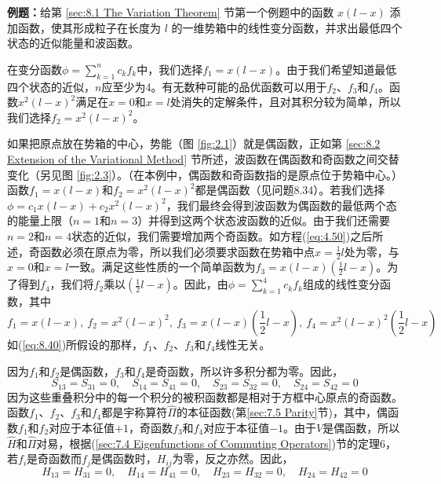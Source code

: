    \begin{examplebox}
        \textbf{例题：}给第 \ref{sec:8.1 The Variation Theorem} 节第一个例题中的函数 $x(l-x)$ 添加函数，使其形成粒子在长度为 $l$ 的一维势箱中的线性变分函数，并求出最低四个状态的近似能量和波函数。

        在变分函数$\phi = \sum_{k=1}^{n}c_kf_k$中，我们选择$f_1 = x(l-x)$。由于我们希望知道最低四个状态的近似，$n$应至少为4。有无数种可能的品优函数可以用于$f_2$、$f_3$和$f_4$。函数$x^2\left(l-x\right)^2$满足在$x=0$和$x=l$处消失的定解条件，且对其积分较为简单，所以我们选择$f_2 = x^2\left(l-x\right)^2$。

        如果把原点放在势箱的中心，势能（图 \ref{fig:2.1}）就是偶函数，正如第 \ref{sec:8.2 Extension of the Variational Method} 节所述，波函数在偶函数和奇函数之间交替变化（另见图 \ref{fig:2.3}）。（在本例中，偶函数和奇函数指的是原点位于势箱中心。）函数$f_1 = x\left(l-x\right)$和$f_2 = x^2\left(l-x\right)^2$都是偶函数（见问题8.34）。若我们选择$\phi = c_1x\left(l-x\right) + c_2x^2\left(l-x\right)^2$，我们最终会得到波函数为偶函数的最低两个态的能量上限（$n=1$和$n=3$）并得到这两个状态波函数的近似。由于我们还需要$n=2$和$n=4$状态的近似，我们需要增加两个奇函数。如方程(\ref{eq:4.50})之后所述，奇函数必须在原点为零，所以我们必须要求函数在势箱中点$x=\frac{1}{2}l$处为零，与$x=0$和$x=l$一致。满足这些性质的一个简单函数为$f_3 = x\left(l-x\right)\left(\frac{1}{2}l-x\right)$。为了得到$f_4$，我们将$f_2$乘以$\left(\frac{1}{2}l-x\right)$。因此，由$\phi = \sum_{k=1}^{4}c_kf_k$组成的线性变分函数，其中
        \begin{equation}
            f_1 = x\left(l-x\right), \: f_2 = x^2\left(l-x\right)^2, \: f_3 = x\left(l-x\right)\left(\frac{1}{2}l-x\right), \: f_4 = x^2\left(l-x\right)^2\left(\frac{1}{2}l-x\right)
            \label{eq:8.62}
        \end{equation}
        如(\ref{eq:8.40})所假设的那样，$f_1$、$f_2$、$f_3$和$f_4$线性无关。

        因为$f_1$和$f_2$是偶函数，$f_3$和$f_4$是奇函数，所以许多积分都为零。因此，
        \begin{equation}
            S_{13} = S_{31} = 0, \quad S_{14} = S_{41} = 0, \quad S_{23} = S_{32} = 0, \quad S_{24} = S_{42} = 0
            \label{eq:8.63}
        \end{equation}
        因为这些重叠积分中的每一个积分的被积函数都是相对于方框中心原点的奇函数。函数$f_1$、$f_2$、$f_3$和$f_4$都是宇称算符$\hat{\Pi}$的本征函数(第\ref{sec:7.5 Parity}节)，其中，偶函数$f_1$和$f_2$对应于本征值$+1$，奇函数$f_3$和$f_4$对应于本征值$-1$。由于$V$是偶函数，所以$\hat{H}$和$\hat{\Pi}$对易，根据(\ref{sec:7.4 Eigenfunctions of Commuting Operators})节的定理6，若$f_i$是奇函数而$f_j$是偶函数时，$H_{ij}$为零，反之亦然。因此，
        \begin{equation}
            H_{13} = H_{31} = 0, \quad H_{14} = H_{41} = 0, \quad H_{23} = H_{32} = 0, \quad H_{24} = H_{42} = 0
            \label{eq:8.64}
        \end{equation}


\end{examplebox}
